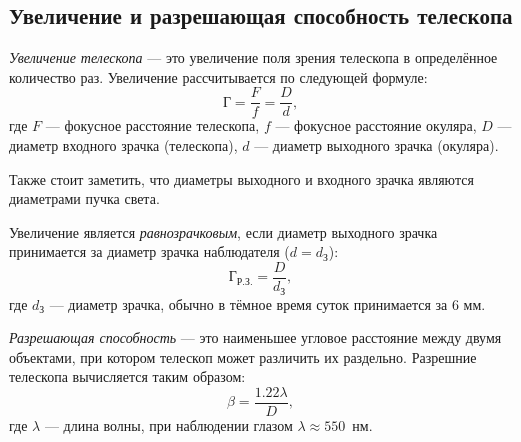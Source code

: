 \subsection{Увеличение и разрешающая способность телескопа}
\textit{Увеличение телескопа} --- это увеличение поля зрения телескопа в определённое количество раз. Увеличение рассчитывается по следующей формуле:
\begin{equation}
\text{Г}=\frac{F}{f}=\frac{D}{d},
\end{equation}
где $F$ --- фокусное расстояние телескопа, $f$ --- фокусное расстояние окуляра, $D$ --- диаметр входного зрачка (телескопа), $d$ --- диаметр выходного зрачка (окуляра).

Также стоит заметить, что диаметры выходного и входного зрачка являются диаметрами пучка света.

Увеличение является \textit{равнозрачковым}, если диаметр выходного зрачка принимается за диаметр зрачка наблюдателя ($d=d_{\text{З}}$):
\begin{equation}
\text{Г}_{\text{Р.З.}}=\frac{D}{d_{\text{З}}},
\end{equation}
где $d_{\text{З}}$ --- диаметр зрачка, обычно в тёмное время суток принимается за 6 мм.

\textit{Разрешающая способность} --- это наименьшее угловое расстояние между двумя объектами, при котором телескоп может различить их раздельно. Разрешние телескопа вычисляется таким образом:
\begin{equation}
\beta=\frac{1.22\lambda}{D},
\end{equation}
где $\lambda$ --- длина волны, при наблюдении глазом $\lambda\approx 550$~нм.